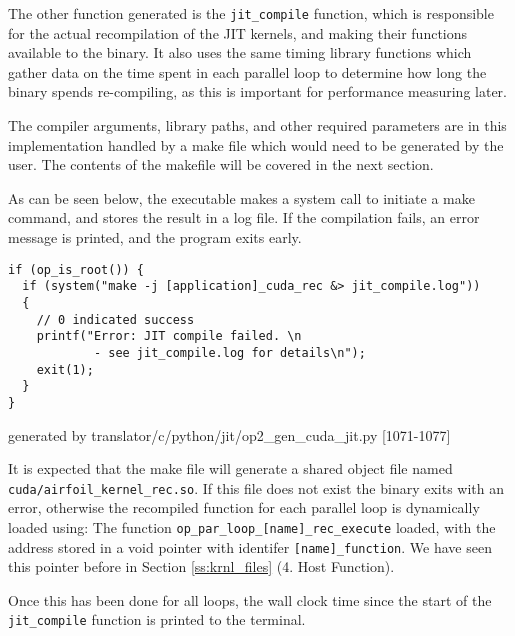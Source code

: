 The other function generated is the \verb|jit_compile| function, which is responsible for the actual recompilation of the JIT kernels, and making their functions available to the binary. It also uses the same timing library functions which gather data on the time spent in each parallel loop to determine how long the binary spends re-compiling, as this is important for performance measuring later.
\par
The compiler arguments, library paths, and other required parameters are in this implementation handled by a make file which would need to be generated by the user. The contents of the makefile will be covered in the next section.
\par
As can be seen below, the executable makes a system call to initiate a make command, and stores the result in a log file. If the compilation fails, an error message is printed, and the program exits early.
\begin{lstlisting}[linewidth = \textwidth, framesep=0pt]
if (op_is_root()) {
  if (system("make -j [application]_cuda_rec &> jit_compile.log"))
  {
    // 0 indicated success
    printf("Error: JIT compile failed. \n
            - see jit_compile.log for details\n");
    exit(1);
  }
}
\end{lstlisting}
\vspace{-1em}
\hspace*{\fill}\footnotesize{generated by translator/c/python/jit/op2\_gen\_cuda\_jit.py [1071-1077]}

It is expected that the make file will generate a shared object file named \verb|cuda/airfoil_kernel_rec.so|. If this file does not exist the binary exits with an error, otherwise the recompiled function for each parallel loop is dynamically loaded using:
The function \verb|op_par_loop_[name]_rec_execute| loaded, with the address stored in a void pointer with identifer \verb|[name]_function|. We have seen this pointer before in Section \ref{ss:krnl_files} (4. Host Function).
\par
Once this has been done for all loops, the wall clock time since the start of the \verb|jit_compile| function is printed to the terminal.

